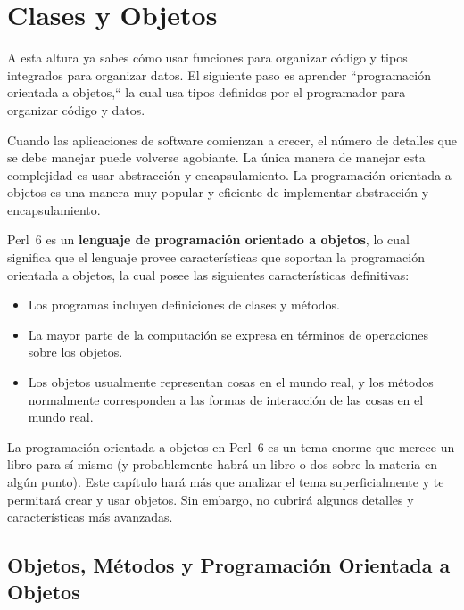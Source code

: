 \chapter{Clases y Objetos}
\label{objects}

A esta altura ya sabes cómo usar funciones para organizar código
y tipos integrados para organizar datos. El siguiente paso es aprender
``programación orientada a objetos,`` la cual usa tipos definidos por
el programador para organizar código y datos.

Cuando las aplicaciones de software comienzan a crecer, el número
de detalles que se debe manejar puede volverse agobiante. La única 
manera de manejar esta complejidad es usar abstracción y encapsulamiento.
La programación orientada a objetos es una manera muy popular y eficiente
de implementar abstracción y encapsulamiento. 

Perl~6 es un {\bf lenguaje de programación orientado a objetos}, lo cual significa
que el lenguaje provee características que soportan la
programación orientada a objetos, la cual posee las siguientes
características definitivas:

\begin{itemize}

\item Los programas incluyen definiciones de clases y métodos.

\item La mayor parte de la computación se expresa en términos de 
operaciones sobre los objetos.

\item Los objetos usualmente representan cosas en el mundo real, y los 
métodos normalmente corresponden a las formas de interacción de las
cosas en el mundo real.
\end{itemize}

La programación orientada a objetos en Perl~6 es un tema enorme que 
merece un libro para sí mismo (y probablemente habrá un libro o dos sobre la
materia en algún punto). Este capítulo hará más que analizar el
tema superficialmente y te permitará crear y usar objetos. Sin embargo,
no cubrirá algunos detalles y características más avanzadas.

\section{Objetos, Métodos y Programación Orientada a Objetos}


